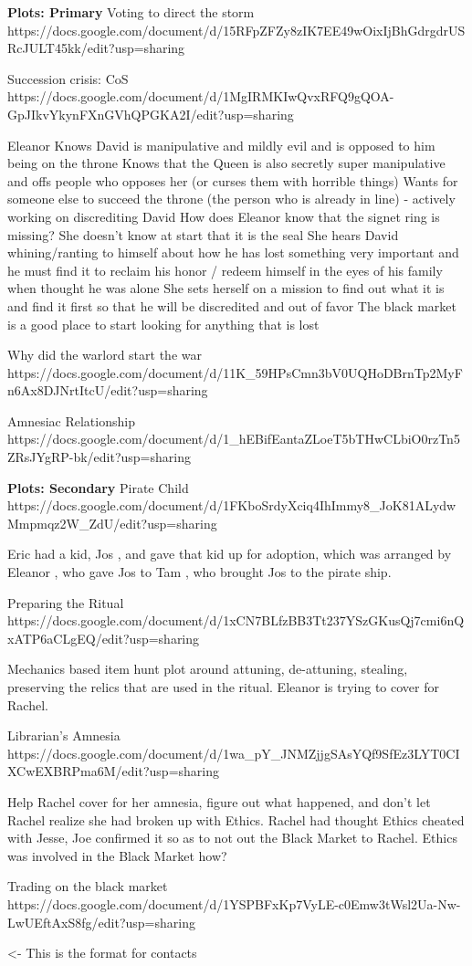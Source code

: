 \documentclass[char]{GL2020}
\begin{document}
\textbf{Plots: Primary}
Voting to direct the storm
https://docs.google.com/document/d/15RFpZFZy8zIK7EE49wOixIjBhGdrgdrUSRcJULT45kk/edit?usp=sharing

Succession crisis: CoS
https://docs.google.com/document/d/1MgIRMKIwQvxRFQ9gQOA-GpJIkvYkynFXnGVhQPGKA2I/edit?usp=sharing

Eleanor
Knows David is manipulative and mildly evil and is opposed to him being on the throne
Knows that the Queen is also secretly super manipulative and offs people who opposes her (or curses them with horrible things)
Wants for someone else to succeed the throne (the person who is already in line) - actively working on discrediting David
How does Eleanor know that the signet ring is missing?
She doesn’t know at start that it is the seal
She hears David whining/ranting to himself about how he has lost something very important and he must find it to reclaim his honor / redeem himself in the eyes of his family when thought he was alone
She sets herself on a mission to find out what it is and find it first so that he will be discredited and out of favor
The black market is a good place to start looking for anything that is lost


Why did the warlord start the war
https://docs.google.com/document/d/11K_59HPsCmn3bV0UQHoDBrnTp2MyFn6Ax8DJNrtItcU/edit?usp=sharing

Amnesiac Relationship
https://docs.google.com/document/d/1_hEBifEantaZLoeT5bTHwCLbiO0rzTn5ZRsJYgRP-bk/edit?usp=sharing

\textbf{Plots: Secondary}
Pirate Child
https://docs.google.com/document/d/1FKboSrdyXciq4IhImmy8_JoK81ALydwMmpmqz2W_ZdU/edit?usp=sharing

Eric \cEvil{} had a kid, Jos \cPirateChild{}, and gave that kid up for adoption, which was arranged by Eleanor \cEthics{}, who gave Jos \cPirateChild{} to Tam \cPirate{}, who brought Jos \cPirateChild{} to the pirate ship.


Preparing the Ritual
https://docs.google.com/document/d/1xCN7BLfzBB3Tt237YSzGKusQj7cmi6nQxATP6aCLgEQ/edit?usp=sharing

Mechanics based item hunt plot around attuning, de-attuning, stealing, preserving the relics that are used in the ritual.  Eleanor is trying to cover for Rachel.

Librarian's Amnesia
https://docs.google.com/document/d/1wa_pY_JNMZjjgSAsYQf9SfEz3LYT0CIXCwEXBRPma6M/edit?usp=sharing

Help Rachel cover for her amnesia, figure out what happened, and don't let Rachel realize she had broken up with Ethics.  Rachel had thought Ethics cheated with Jesse, Joe confirmed it so as to not out the Black Market to Rachel.  Ethics was involved in the Black Market how?

Trading on the black market
https://docs.google.com/document/d/1YSPBFxKp7VyLE-c0Emw3tWsl2Ua-Nw-LwUEftAxS8fg/edit?usp=sharing

\begin{itemz}[Goals]
	\item 
\end{itemz}

\begin{itemz}[Notes]
	\item 
\end{itemz}

\begin{contacts}
	\contact{\cTest{}} <- This is the format for contacts 
\end{contacts}
\end{document}

